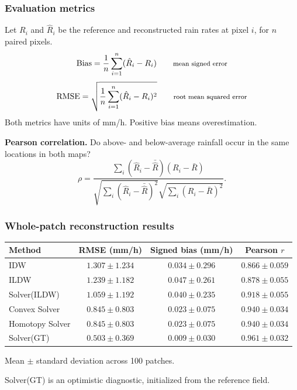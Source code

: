 \documentclass[aspectratio=169]{beamer}
\newcommand{\slidetitle}[1]{\frametitle{#1}}
\begin{document}
\begin{frame}[t]
\frametitle{Evaluation metrics}
Let $R_i$ and $\hat R_i$ be the reference and reconstructed rain rates at pixel $i$, for $n$ paired pixels.
\[\mathrm{Bias}=\frac1n\sum_{i=1}^n(\hat R_i-R_i)\qquad\text{\footnotesize mean signed error}\]
\[\mathrm{RMSE}=\sqrt{\frac1n\sum_{i=1}^n(\hat R_i-R_i)^2}\qquad\text{\footnotesize root mean squared error}\]
Both metrics have units of mm/h. Positive bias means overestimation.

\vspace{2mm}
\textbf{Pearson correlation.} Do above- and below-average rainfall occur in the same locations in both maps?
\[\rho=\frac{\sum_i(\hat R_i-\bar{\hat R})(R_i-\bar R)}{\sqrt{\sum_i(\hat R_i-\bar{\hat R})^2}\sqrt{\sum_i(R_i-\bar R)^2}}.\]
\end{frame}

\begin{frame}[t]
\slidetitle{Whole-patch reconstruction results}
\centering\small
\renewcommand{\arraystretch}{1.35}
\begin{tabular}{lccc}
\toprule Method & RMSE (mm/h) & Signed bias (mm/h) & Pearson $r$\\\midrule
IDW & $1.307\pm1.234$ & $0.034\pm0.296$ & $0.866\pm0.059$\\
ILDW & $1.239\pm1.182$ & $0.047\pm0.261$ & $0.878\pm0.055$\\
Solver(ILDW) & $1.059\pm1.192$ & $0.040\pm0.235$ & $0.918\pm0.055$\\
Convex Solver & $0.845\pm0.803$ & $0.023\pm0.075$ & $0.940\pm0.034$\\
Homotopy Solver & $0.845\pm0.803$ & $0.023\pm0.075$ & $0.940\pm0.034$\\
Solver(GT) & $0.503\pm0.369$ & $0.009\pm0.030$ & $0.961\pm0.032$\\\bottomrule
\end{tabular}
\par\vspace{5mm}\normalsize
Mean $\pm$ standard deviation across 100 patches.
\par\vspace{3mm}
Solver(GT) is an optimistic diagnostic, initialized from the reference field.
\end{frame}
\end{document}
